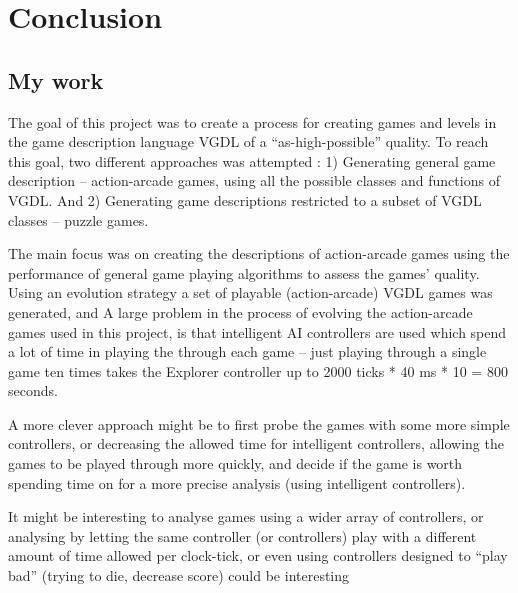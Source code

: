 \documentclass[a4paper,titlepage,final]{report}
\begin{document}

\chapter{Conclusion}


\section{My work}
The goal of this project was to create a process for creating games and levels in the game description language VGDL of a ``as-high-possible'' quality.
To reach this goal, two different approaches was attempted : 
1) Generating general game description -- action-arcade games, using all the possible classes and functions of VGDL.
And 2) Generating game descriptions restricted to a subset of VGDL classes -- puzzle games.

The main focus was on creating the descriptions of action-arcade games using the performance of general game playing algorithms to assess the games' quality.
Using an evolution strategy a set of playable (action-arcade) VGDL games was generated, and
A large problem in the process of evolving the action-arcade games used in this project, is that intelligent AI controllers are used which spend a lot of time in playing the through each game -- just playing through a single game ten times takes the Explorer controller up to 2000 ticks * 40 ms * 10 = 800 seconds.

A more clever approach might be to first probe the games with some more simple controllers, or decreasing the allowed time for intelligent controllers, allowing the games to be played through more quickly, and decide if the game is worth spending time on for a more precise analysis (using intelligent controllers).

It might be interesting to analyse games using a wider array of controllers, or analysing by letting the same controller (or controllers) play with a different amount of time allowed per clock-tick, or even using controllers designed to ``play bad'' (trying to die, decrease score) could be interesting
\end{document}
